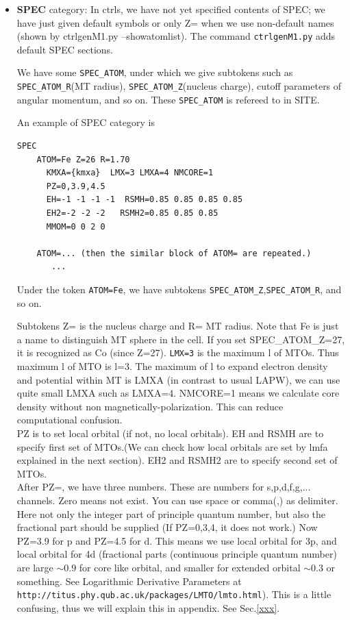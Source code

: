 \documentclass[a4paper,10pt,epsf,fleqn]{article}
\begin{document}
{\begin{itemize}
\item
{\bf SPEC} category: 
In ctrls, we have not yet specified contents of SPEC; 
we have just given default symbols or only Z= when we use non-default
names (shown by ctrlgenM1.py --showatomlist).
The command \verb+ctrlgenM1.py+ adds default SPEC sections.

We have some \verb+SPEC_ATOM+, 
under which we give subtokens such as
\verb+SPEC_ATOM_R+(MT radius), \verb+SPEC_ATOM_Z+(nucleus charge), 
cutoff parameters of angular momentum, and so on. 
These \verb+SPEC_ATOM+ is refereed to in SITE.

An example of SPEC category is
\begin{verbatim}
SPEC                                                            
    ATOM=Fe Z=26 R=1.70 
      KMXA={kmxa}  LMX=3 LMXA=4 NMCORE=1                        
      PZ=0,3.9,4.5
      EH=-1 -1 -1 -1  RSMH=0.85 0.85 0.85 0.85          
      EH2=-2 -2 -2   RSMH2=0.85 0.85 0.85
      MMOM=0 0 2 0                                                    
  
    ATOM=... (then the similar block of ATOM= are repeated.)
       ...
\end{verbatim}
Under the token \verb+ATOM=Fe+, we have subtokens
\verb+SPEC_ATOM_Z+,\verb+SPEC_ATOM_R+, and so on.

Subtokens Z= is the nucleus charge and R= MT radius.
Note that Fe is just a name to distinguish MT sphere in the cell.
If you set SPEC\_ATOM\_Z=27, it is recognized as Co (since Z=27). 
\verb+LMX=3+ is the maximum l of MTOs. Thus maximum l of MTO is l=3.
The maximum of l to expand electron density and potential within MT is
LMXA (in contrast to usual LAPW), we can use quite small LMXA such as
LMXA=4. NMCORE=1 means we calculate core density without non magnetically-polarization.
This can reduce computational confusion.\\

PZ is to set local orbital (if not, no local orbitals). EH and RSMH are
to specify first set of MTOs.(We can check how local orbitals are 
set by lmfa explained in the next section).
EH2 and RSMH2 are to specify second set of MTOs. \\

After PZ=, we have three numbers.
These are numbers for s,p,d,f,g,... channels. Zero means not exist.
You can use space or comma(,) as delimiter. 
Here not only the integer part of principle quantum number, but also 
the fractional part should be supplied (If PZ=0,3,4, it does not work.)
Now PZ=3.9 for p and PZ=4.5 for d. This means we use local orbital for
3p, and local orbital for 4d (fractional parts (continuous principle quantum number) 
are large $\sim 0.9$ for core like orbital, and smaller for extended
orbital $\sim 0.3$ or something. See Logarithmic Derivative Parameters
at \verb+http://titus.phy.qub.ac.uk/packages/LMTO/lmto.html+).
This is a little confusing, thus we will explain this in appendix. See Sec.\ref{xxx}.\\


\end{itemize}}
\end{document}
